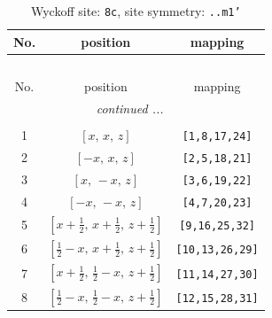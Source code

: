 \documentclass[fleqn,8pt]{jsarticle}
\begin{document}
\renewcommand{\arraystretch}{1.2}
\begin{longtable}{ccc}
\caption{Wyckoff site: {\tt 8c}, site symmetry: {\tt ..m1'}}
 \\
 \hline \hline
No. & position & mapping \\ \hline \endfirsthead

\multicolumn{2}{l}{\tablename\ \thetable{}} \\
 \hline \hline
No. & position & mapping \\ \hline \endhead

 \hline \hline
\multicolumn{2}{r}{\footnotesize\it continued ...} \\ \endfoot

 \hline \hline
\multicolumn{2}{r}{} \\ \endlastfoot

1 & $\left[ x,\, x,\, z \right]$ & {\tt [1,8,17,24]} \\ \hline
2 & $\left[ - x,\, x,\, z \right]$ & {\tt [2,5,18,21]} \\ \hline
3 & $\left[ x,\, - x,\, z \right]$ & {\tt [3,6,19,22]} \\ \hline
4 & $\left[ - x,\, - x,\, z \right]$ & {\tt [4,7,20,23]} \\ \hline
5 & $\left[ x + \frac{1}{2},\, x + \frac{1}{2},\, z + \frac{1}{2} \right]$ & {\tt [9,16,25,32]} \\ \hline
6 & $\left[ \frac{1}{2} - x,\, x + \frac{1}{2},\, z + \frac{1}{2} \right]$ & {\tt [10,13,26,29]} \\ \hline
7 & $\left[ x + \frac{1}{2},\, \frac{1}{2} - x,\, z + \frac{1}{2} \right]$ & {\tt [11,14,27,30]} \\ \hline
8 & $\left[ \frac{1}{2} - x,\, \frac{1}{2} - x,\, z + \frac{1}{2} \right]$ & {\tt [12,15,28,31]} \\
\end{longtable}
\renewcommand{\arraystretch}{1.2}
\end{document}
